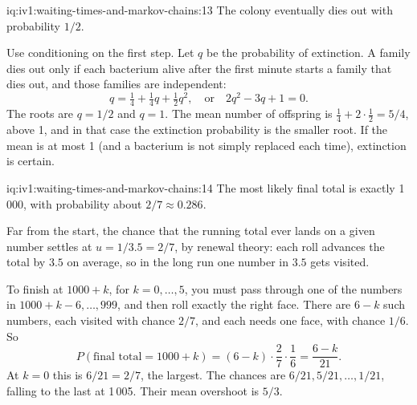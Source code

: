 \begin{solution}{iq:iv1:waiting-times-and-markov-chains:13}
The colony eventually dies out with probability $1/2$.

Use conditioning on the first step. Let $q$ be the probability of extinction. A family dies out only if each bacterium alive after the first minute starts a family that dies out, and those families are independent:
\[
q = \tfrac14 + \tfrac14 q + \tfrac12 q^2, \quad\text{or}\quad 2q^2 - 3q + 1 = 0.
\]
The roots are $q = 1/2$ and $q = 1$. The mean number of offspring is $\tfrac14 + 2 \cdot \tfrac12 = 5/4$, above 1, and in that case the extinction probability is the smaller root. If the mean is at most 1 (and a bacterium is not simply replaced each time), extinction is certain.

\end{solution}

\begin{solution}{iq:iv1:waiting-times-and-markov-chains:14}
The most likely final total is exactly 1\,000, with probability about $2/7 \approx 0.286$.

Far from the start, the chance that the running total ever lands on a given number settles at $u = 1/3.5 = 2/7$, by renewal theory: each roll advances the total by $3.5$ on average, so in the long run one number in $3.5$ gets visited.

To finish at $1000 + k$, for $k = 0, \dots, 5$, you must pass through one of the numbers in $1000 + k - 6, \dots, 999$, and then roll exactly the right face. There are $6 - k$ such numbers, each visited with chance $2/7$, and each needs one face, with chance $1/6$. So
\[
P(\text{final total} = 1000 + k) = (6 - k) \cdot \frac27 \cdot \frac16 = \frac{6 - k}{21}.
\]
At $k = 0$ this is $6/21 = 2/7$, the largest. The chances are $6/21, 5/21, \dots, 1/21$, falling to the last at 1\,005. Their mean overshoot is $5/3$.

\end{solution}

